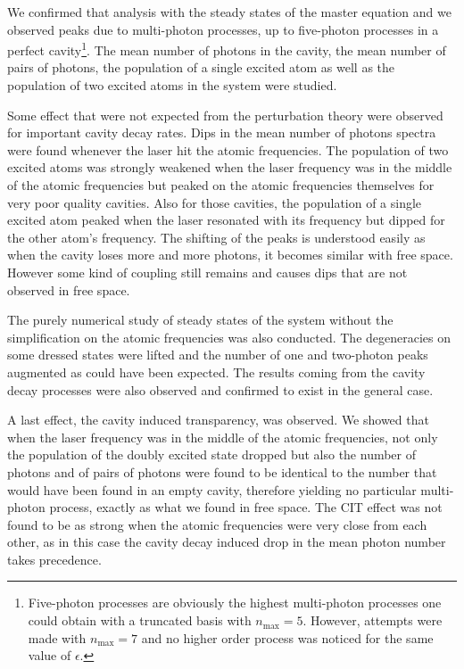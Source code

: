 We confirmed that analysis with the steady states of the master equation and we observed peaks due to multi-photon processes, up to five-photon processes in a perfect cavity\footnote{Five-photon processes are obviously the highest multi-photon processes one could obtain with a truncated basis with $n_{\mbox{max}}=5$. However, attempts were made with $n_{\mbox{max}}=7$ and no higher order process was noticed for the same value of $\epsilon$.}. The mean number of photons in the cavity, the mean number of pairs of photons, the population of a single excited atom as well as the population of two excited atoms in the system were studied.

Some effect that were not expected from the perturbation theory were observed for important cavity decay rates. Dips in the mean number of photons spectra were found whenever the laser hit the atomic frequencies. The population of two excited atoms was strongly weakened when the laser frequency was in the middle of the atomic frequencies but peaked on the atomic frequencies themselves for very poor quality cavities. Also for those cavities,  the population of a single excited atom peaked when the laser resonated with its frequency but dipped for the other atom's frequency. The shifting of the peaks is understood easily as when the cavity loses more and more photons, it becomes similar with free space. However some kind of coupling still remains and causes dips that are not observed in free space.

The purely numerical study of steady states of the system without the simplification on the atomic frequencies was also conducted. The degeneracies on some dressed states were lifted and the number of one and two-photon peaks augmented as could have been expected. The results coming from the cavity decay processes were also observed and confirmed to exist in the general case.

A last effect, the cavity induced transparency, was observed. We showed that when the laser frequency was in the middle of the atomic frequencies, not only the population of the doubly excited state dropped but also the number of photons and of pairs of photons were found to be identical to the number that would have been found in an empty cavity, therefore yielding no particular multi-photon process, exactly as what we found in free space. The CIT effect was not found to be as strong when the atomic frequencies were very close from each other, as in this case the cavity decay induced drop in the mean photon number takes precedence.

